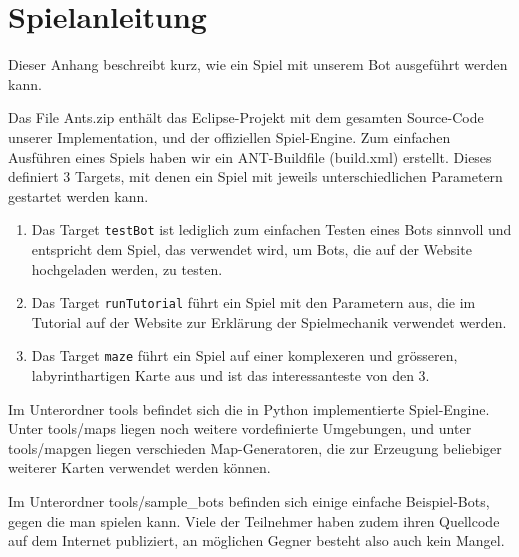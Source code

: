 \chapter{Spielanleitung}
\label{chap:spielanleitung}

Dieser Anhang beschreibt kurz, wie ein Spiel mit unserem Bot ausgef\"uhrt werden kann.

Das File Ants.zip enth\"alt das Eclipse-Projekt mit dem gesamten Source-Code unserer Implementation, und der offiziellen Spiel-Engine. Zum einfachen Ausf\"uhren eines Spiels haben wir ein ANT-Buildfile (build.xml) erstellt. Dieses definiert 3 Targets, mit denen ein Spiel mit jeweils unterschiedlichen Parametern gestartet werden kann.
\begin{enumerate}
\item{Das Target \texttt{testBot} ist lediglich zum einfachen Testen eines Bots sinnvoll und entspricht dem Spiel, das verwendet wird, um Bots, die auf der Website hochgeladen werden, zu testen.}

\item{Das Target \texttt{runTutorial} f\"uhrt ein Spiel mit den Parametern aus, die im Tutorial auf der Website zur Erkl\"arung der Spielmechanik verwendet werden.}
\item{
Das Target \texttt{maze} f\"uhrt ein Spiel auf einer komplexeren und gr\"osseren, labyrinthartigen Karte aus und ist das interessanteste von den 3.}

\end{enumerate}

Im Unterordner tools befindet sich die in Python implementierte Spiel-Engine. Unter tools/maps liegen noch weitere vordefinierte Umgebungen, und unter tools/mapgen liegen verschieden Map-Generatoren, die zur Erzeugung beliebiger weiterer Karten verwendet werden k\"onnen. 

Im Unterordner tools/sample\_bots befinden sich einige einfache Beispiel-Bots, gegen die man spielen kann. Viele der Teilnehmer haben zudem ihren Quellcode auf dem Internet publiziert, an m\"oglichen Gegner besteht also auch kein Mangel.